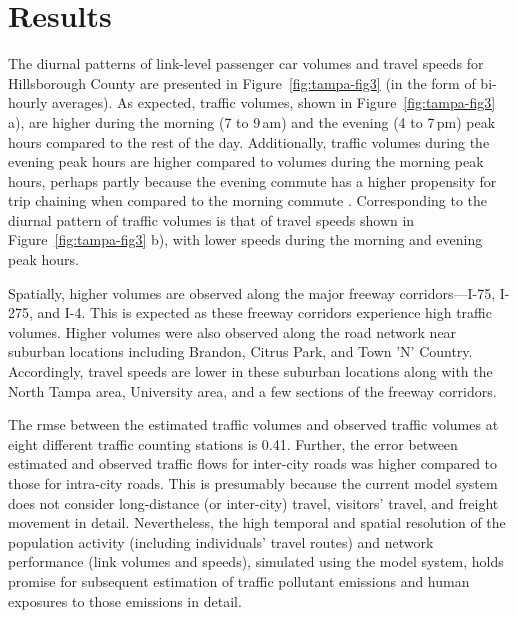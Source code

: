 \section{Results}
The diurnal patterns of link-level passenger car volumes and travel speeds for Hillsborough County are presented in Figure~\ref{fig:tampa-fig3} (in the form of bi-hourly averages). As expected, traffic volumes, shown in Figure~\ref{fig:tampa-fig3} a), are higher during the morning (7 to 9\,am) and the evening (4 to 7\,pm) peak hours compared to the rest of the day. Additionally, traffic volumes during the evening peak hours are higher compared to volumes during the morning peak hours, perhaps partly because the evening commute has a higher propensity for trip chaining when compared to the morning commute \citep[][]{ChuYL_TRR_2003}. Corresponding to the diurnal pattern of traffic volumes is that of travel speeds shown in Figure~\ref{fig:tampa-fig3} b), with lower speeds during the morning and evening peak hours.

Spatially, higher volumes are observed along the major freeway corridors---I-75, I-275, and I-4. This is expected as these freeway corridors experience high traffic volumes. Higher volumes were also observed along the road network near suburban locations including Brandon, Citrus Park, and Town 'N' Country. Accordingly, travel speeds are lower in these suburban locations along with the North Tampa area, University area, and a few sections of the freeway corridors. 

The \gls{rmse} between the estimated traffic volumes and observed traffic volumes at eight different traffic counting stations is 0.41. Further, the error between estimated and observed traffic flows for inter-city roads was higher compared to those for intra-city roads. This is presumably because the current model system does not consider long-distance (or inter-city) travel, visitors' travel, and freight movement in detail. Nevertheless, the high temporal and spatial resolution of the population activity (including individuals' travel routes) and network performance (\ie link volumes and speeds), simulated using the model system, holds promise for subsequent estimation of traffic pollutant emissions and human exposures to those emissions in detail.  

